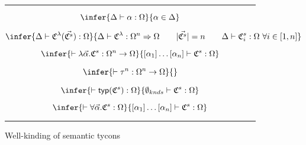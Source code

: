\begin{figure}
\hrule


\begin{equation}
\infer{\Delta \vdash \alpha : \Omega}{\alpha \in \Delta}
\label{eq:semtypevar}
\end{equation}

\begin{equation}
\infer{\Delta \vdash \mathfrak{C}^\lambda(\vec{\mathfrak{C}^s}) : \Omega}
{\Delta \vdash
  \mathfrak{C}^\lambda :  \Omega^n \Rightarrow \Omega
  \qquad |\vec{\mathfrak{C}^s}| = n \qquad \Delta\vdash \mathfrak{C}^s_i : \Omega
  ~\forall i\in [1,n]}
\label{eq:semtypeapp}
\end{equation}


\begin{equation}
\infer{\vdash \lambda\vec{\alpha}.\mathfrak{C}^s :
  \Omega^n\to \Omega}
{
  [\alpha_1]\ldots[\alpha_n] \vdash \mathfrak{C}^s : \Omega}
\end{equation}

\begin{equation}
\infer{\vdash \tau^n : \Omega^n \to \Omega}
{\strut}
\label{eq:semtypeatomic}
\end{equation}


\begin{equation}
\infer{\vdash \mathsf{typ}(\mathfrak{C}^s) : \Omega}
{\emptyset_{knds} \vdash  \mathfrak{C}^s : \Omega}
\label{eq:semtype-typ}
\end{equation}

\begin{equation}
\infer{ \vdash \forall\vec{\alpha}.\mathfrak{C}^s :
  \Omega}
{[\alpha_1]\ldots[\alpha_n]
  \vdash \mathfrak{C}^s : \Omega}
\label{eq:semtype-fa}
\end{equation}

\hrule
\caption{Well-kinding of semantic tycons}
\label{fig:kindingsemantic}
\end{figure}
